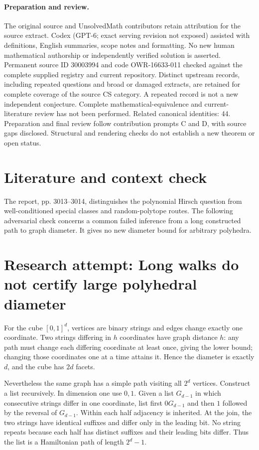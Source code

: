\documentclass[11pt]{article}
\begin{document}
\paragraph{Preparation and review.}
The original source and UnsolvedMath contributors retain attribution for the source extract. Codex (GPT-6; exact serving revision not exposed) assisted with definitions, English summaries, scope notes and formatting. No new human mathematical authorship or independently verified solution is asserted. Permanent source ID 30003994 and code OWR-16633-011 checked against the complete supplied registry and current repository. Distinct upstream records, including repeated questions and broad or damaged extracts, are retained for complete coverage of the source CS category. A repeated record is not a new independent conjecture. Complete mathematical-equivalence and current-literature review has not been performed. Related canonical identities: 44. Preparation and final review follow contribution prompts C and D, with source gaps disclosed. Structural and rendering checks do not establish a new theorem or open status.
\label{end:30003994}

\section{Literature and context check}
The report, pp. 3013--3014, distinguishes the polynomial Hirsch question from well-conditioned special classes and random-polytope routes. The following adversarial check concerns a common failed inference from a long constructed path to graph diameter. It gives no new diameter bound for arbitrary polyhedra.
\section{Research attempt: Long walks do not certify large polyhedral diameter}
For the cube $[0,1]^d$, vertices are binary strings and edges change exactly one coordinate. Two strings differing in $h$ coordinates have graph distance $h$: any path must change each differing coordinate at least once, giving the lower bound; changing those coordinates one at a time attains it. Hence the diameter is exactly $d$, and the cube has $2d$ facets.

Nevertheless the same graph has a simple path visiting all $2^d$ vertices. Construct a list recursively. In dimension one use $0,1$. Given a list $G_{d-1}$ in which consecutive strings differ in one coordinate, list first $0G_{d-1}$ and then $1$ followed by the reversal of $G_{d-1}$. Within each half adjacency is inherited. At the join, the two strings have identical suffixes and differ only in the leading bit. No string repeats because each half has distinct suffixes and their leading bits differ. Thus the list is a Hamiltonian path of length $2^d-1$.
\end{document}
